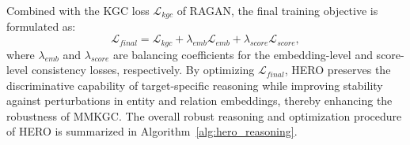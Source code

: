 \documentclass[pdflatex,sn-mathphys-num]{sn-jnl}
\begin{document}
Combined with the KGC loss $\mathcal{L}_{kgc}$ of RAGAN, the final training objective is formulated as:
\begin{equation}
\mathcal{L}_{final}
=
\mathcal{L}_{kgc}
+
\lambda_{emb}\mathcal{L}_{emb}
+
\lambda_{score}\mathcal{L}_{score},
\end{equation}
where $\lambda_{emb}$ and $\lambda_{score}$ are balancing coefficients for the embedding-level and score-level consistency losses, respectively. By optimizing $\mathcal{L}_{final}$, HERO preserves the discriminative capability of target-specific reasoning while improving stability against perturbations in entity and relation embeddings, thereby enhancing the robustness of MMKGC. The overall robust reasoning and optimization procedure of HERO is summarized in Algorithm~\ref{alg:hero_reasoning}.
\end{document}
